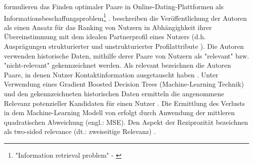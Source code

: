 \textcite[S. 66ff.]{diaz:inproceedings} formulieren das Finden optimaler Paare in Online-Dating-Plattformen als Informationsbeschaffungsproblem\footnote{"Information retrieval problem" - \textcite[S. 67]{diaz:inproceedings}} \cite[S. 550]{koprinska:inbook}.
\textcite[S. 550]{koprinska:inbook} beschreiben die Veröffentlichung der Autoren als einen Ansatz für das Ranking von Nutzern in Abhängighkeit ihrer Übereinstimmung mit dem idealen Partnerprofil eines Nutzers (d.h. Ausprägungen strukturierter und unstrukturierter Profilattribute \cite[S. 288]{li:article}\cite[S. 272]{pizzato:2:inproceedings}).
Die Autoren verwenden historische Daten, mithilfe derer Paare von Nutzern als "relevant" bzw. "nicht-relevant" gekennzeichnet werden.
Als relevant bezeichnen die Autoren Paare, in denen Nutzer Kontaktinformation ausgetauscht haben \cite[S. 66ff.]{diaz:inproceedings}.
Unter Verwendung eines Gradient Boosted Decision Trees (Machine-Learning Technik) und den gekennzeichneten historischen Daten ermitteln \textcite[S. 69]{diaz:inproceedings} die angenommene Relevanz potenzieller Kandidaten für einen Nutzer \cite[S. 550]{koprinska:inbook}.
Die Ermittlung des Verlusts in dem Machine-Learning Modell von \textcite[S. 69]{diaz:inproceedings} erfolgt durch Anwendung der mittleren quadratischen Abweichung (engl.: \ac{MSE}).
Den Aspekt der Reziprozität bezeichnen \textcite[S. 66]{diaz:inproceedings} als two-sided relevance (dt.: zweiseitige Relevanz) \cite[S. 550]{koprinska:inbook}.

